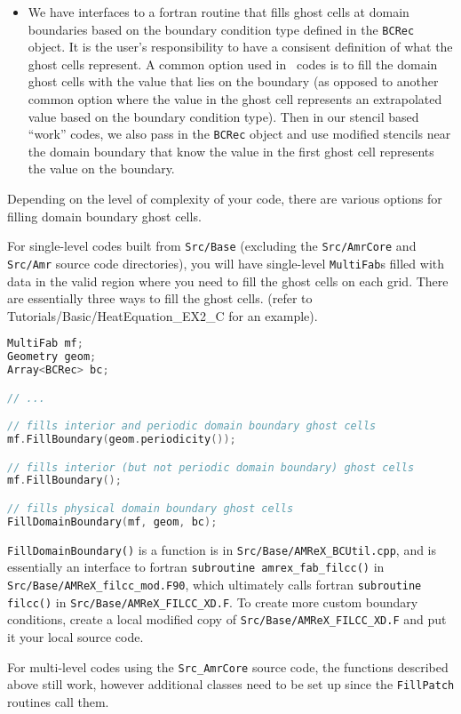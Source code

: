 \begin{itemize}
\item We have interfaces to a fortran routine that fills ghost cells at domain
boundaries based on the boundary condition type defined in the {\tt BCRec} object.
It is the user's responsibility to have a consisent definition of what the ghost cells
represent.  A common option used in \amrex\ codes is to fill the domain ghost cells
with the value that lies on the boundary (as opposed to another common option where
the value in the ghost cell represents an extrapolated value based on the boundary
condition type).  Then in our stencil based ``work'' codes, we also pass in the
{\tt BCRec} object and use modified stencils near the domain boundary that know the value
in the first ghost cell represents the value on the boundary.

\end{itemize}

Depending on the level of complexity of your code, there are various options
for filling domain boundary ghost cells.

For single-level codes built from {\tt Src/Base} (excluding the 
{\tt Src/AmrCore} and {\tt Src/Amr} source code directories), you will have 
single-level {\tt MultiFab}s filled with data in the valid region where you need 
to fill the ghost cells on each grid.  There are essentially three ways to fill the ghost 
cells. (refer to Tutorials/Basic/HeatEquation\_EX2\_C for an example).

\begin{lstlisting}[language=cpp]
MultiFab mf;
Geometry geom;
Array<BCRec> bc;

// ...

// fills interior and periodic domain boundary ghost cells
mf.FillBoundary(geom.periodicity());

// fills interior (but not periodic domain boundary) ghost cells
mf.FillBoundary();

// fills physical domain boundary ghost cells
FillDomainBoundary(mf, geom, bc);
\end{lstlisting}

{\tt FillDomainBoundary()} is a function is in {\tt Src/Base/AMReX\_BCUtil.cpp},
and is essentially an interface to fortran {\tt subroutine amrex\_fab\_filcc()}
in {\tt Src/Base/AMReX\_filcc\_mod.F90}, which ultimately calls fortran 
{\tt subroutine filcc()} in {\tt Src/Base/AMReX\_FILCC\_XD.F}.  To create more
custom boundary conditions, create a local modified copy of
{\tt Src/Base/AMReX\_FILCC\_XD.F} and put it your local source code.

For multi-level codes using the {\tt Src\_AmrCore} source code, the
functions described above still work, however additional classes need to
be set up since the {\tt FillPatch} routines call them.






